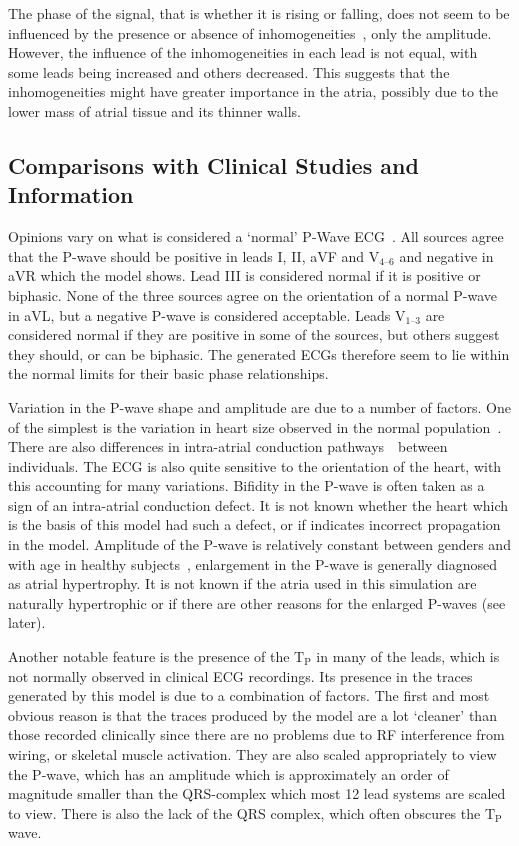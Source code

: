 The phase of the signal, that is whether it is rising or falling, does not seem
to be influenced by the presence or absence of
inhomogeneities~\cite{Ramanathan2001a,Gulrajani1983}, only the amplitude.
However, the influence of the inhomogeneities in each lead is not equal, with
some leads being increased and others decreased.
This suggests that the inhomogeneities might have greater importance in the
atria, possibly due to the lower mass of atrial tissue and its thinner walls.

\subsection{Comparisons with Clinical Studies and Information}

Opinions vary on what is considered a `normal'
P-Wave ECG~\cite{Lipman1994,Conover1996,Hampton1997}.
All sources agree that the P-wave should be positive in leads I, II, aVF and
$\text{V}_{\text{4--6}}$ and negative in aVR which the model shows.
Lead III is considered normal if it is positive or biphasic.
None of the three sources agree on the orientation of a normal P-wave in aVL,
but a negative P-wave is considered acceptable.
Leads $\text{V}_{\text{1--3}}$ are considered normal if they are positive in
some of the sources, but others suggest they should, or can be biphasic.
The generated ECGs therefore seem to lie within the normal limits for their
basic phase relationships.

Variation in the P-wave shape and amplitude are due to a number of factors.
One of the simplest is the variation in heart size observed
in the normal population~\cite{Oberman1967}.
There are also differences in intra-atrial conduction
pathways~\cite{Platonov2008a}\ between individuals.
The ECG is also quite sensitive to the orientation of the heart, with this
accounting for many variations.
Bifidity in the P-wave is often taken as a sign of an intra-atrial conduction
defect.
It is not known whether the heart which is the basis of this model had such a
defect, or if indicates incorrect propagation in the model.
Amplitude of the P-wave is relatively constant between genders and with age in
healthy subjects~\cite{MacFarlane1989a}, enlargement in the P-wave is generally
diagnosed as atrial hypertrophy.
It is not known if the atria used in this simulation are naturally hypertrophic
or if there are other reasons for the enlarged P-waves (see later).

Another notable feature is the presence of the $\text{T}_{\text{P}}$ in many of
the leads, which is not normally observed in clinical ECG recordings.
Its presence in the traces generated by this model is due to a combination of
factors.
The first and most obvious reason is that the traces produced by the model are a
lot `cleaner' than those recorded clinically since there are no problems due to
RF interference from wiring, or skeletal muscle activation.
They are also scaled appropriately to view the P-wave, which has an
amplitude which is approximately an order of magnitude smaller than the
QRS-complex which most 12 lead systems are scaled to view.
There is also the lack of the QRS complex, which often obscures the
$\text{T}_{\text{P}}$ wave.

